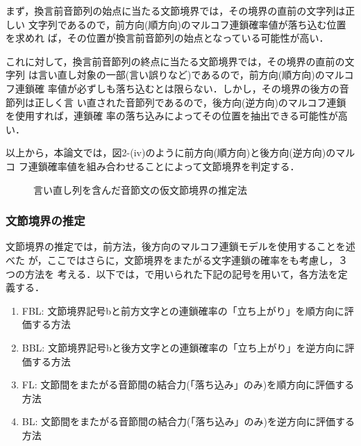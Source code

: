 まず，換言前音節列の始点に当たる文節境界では，その境界の直前の文字列は正しい
文字列であるので，前方向(順方向)のマルコフ連鎖確率値が落ち込む位置を求めれ
ば，その位置が換言前音節列の始点となっている可能性が高い．

これに対して，換言前音節列の終点に当たる文節境界では，その境界の直前の文字列
は言い直し対象の一部(言い誤りなど)であるので，前方向(順方向)のマルコフ連鎖確
率値が必ずしも落ち込むとは限らない．しかし，その境界の後方の音節列は正しく言
い直された音節列であるので，後方向(逆方向)のマルコフ連鎖を使用すれば，連鎖確
率の落ち込みによってその位置を抽出できる可能性が高い．

以上から，本論文では，図2-(iv)のように前方向(順方向)と後方向(逆方向)のマルコ
フ連鎖確率値を組み合わせることによって文節境界を判定する．
\vfill
\begin{figure}[p]
  \begin{center}
    \medskip
    \caption{言い直し列を含んだ音節文の仮文節境界の推定法}
    \label{fig:2}
  \end{center}
\end{figure}
\subsubsection{文節境界の推定}

文節境界の推定では，前方法，後方向のマルコフ連鎖モデルを使用することを述べた
が，ここではさらに，文節境界をまたがる文字連鎖の確率をも考慮し，３つの方法を
考える．以下では，\cite{araki:97:a}で用いられた下記の記号を用いて，各方法を定
義する．
\Vspace
\begin{enumerate}
\item FBL:
文節境界記号bと前方文字との連鎖確率の「立ち上がり」を順方向に評価する方法
\item BBL:
文節境界記号bと後方文字との連鎖確率の「立ち上がり」を逆方向に評価する方法
\item FL:
文節間をまたがる音節間の結合力(「落ち込み」のみ)を順方向に評価する方法
\item BL:
文節間をまたがる音節間の結合力(「落ち込み」のみ)を逆方向に評価する方法
\end{enumerate}
\Vspace

